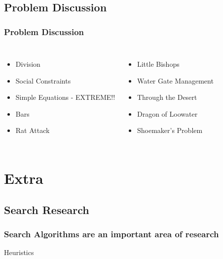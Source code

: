 \documentclass{beamer}
\begin{document}
\subsection{Problem Discussion}
\begin{frame}
  \frametitle{Problem Discussion}
  \begin{columns}
    \begin{itemize}
    \item Division
    \item Social Constraints
    \item Simple Equations - EXTREME!!
    \item Bars
    \item Rat Attack
    \end{itemize}
    \begin{itemize}
    \item Little Bishops
    \item Water Gate Management
    \item Through the Desert
    \item Dragon of Loowater
    \item Shoemaker's Problem
    \end{itemize}
  \end{columns}
\end{frame}


\section{Extra}
\subsection{Search Research}
\begin{frame}
  \frametitle{Search Algorithms are an important area of research}
  Heuristics
\end{frame}
\end{document}
